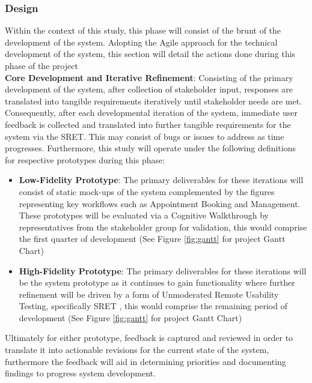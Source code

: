 \documentclass[11pt,a4paper,titlepage]{article}
\begin{document}
	\subsubsection{Design}
	Within the context of this study, this phase will consist of the brunt of the development of the system. Adopting the Agile \cite{shore2021art} approach for the technical development of the system, this section will detail the actions done during this phase of the project \\
	\textbf{Core Development and Iterative Refinement}: Consisting of the primary development of the system, after collection of stakeholder input, responses are translated into tangible requirements iteratively until stakeholder needs are met. Consequently, after each developmental iteration of the system, immediate user feedback is collected and translated into further tangible requirements for the system via the SRET. This may consist of bugs or issues to address as time progresses. Furthermore, this study will operate under the following definitions for respective prototypes during this phase: 
	\begin{itemize}
		\item \textbf{Low-Fidelity Prototype}: The primary deliverables for these iterations will consist of static mock-ups of the system complemented by the figures representing key workflows such as Appointment Booking and Management. These prototypes will be evaluated via a Cognitive Walkthrough by representatives from the stakeholder group for validation, this would comprise the first quarter of development (See Figure \ref{fig:gantt} for project Gantt Chart)
		\item \textbf{High-Fidelity Prototype}: The primary deliverables for these iterations will be the system prototype as it continues to gain functionality where further refinement will be driven by a form of Unmoderated Remote Usability Testing, specifically SRET \cite{lewis2012usability, usertesting_2019_17}, this would comprise the remaining period of development (See Figure \ref{fig:gantt} for project Gantt Chart)
	\end{itemize}
	Ultimately for either prototype, feedback is captured and reviewed in order to translate it into actionable revisions for the current state of the system, furthermore the feedback will aid in determining priorities and documenting findings to progress system development. 
	\clearpage 
\end{document}
